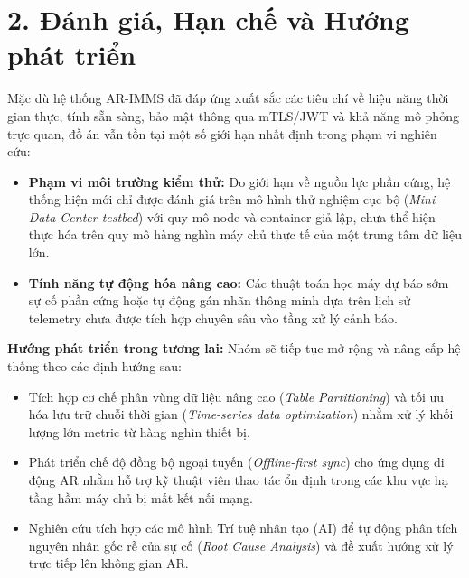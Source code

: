 \section*{2. Đánh giá, Hạn chế và Hướng phát triển}
Mặc dù hệ thống AR-IMMS đã đáp ứng xuất sắc các tiêu chí về hiệu năng thời gian thực, tính sẵn sàng, bảo mật thông qua mTLS/JWT và khả năng mô phỏng trực quan, đồ án vẫn tồn tại một số giới hạn nhất định trong phạm vi nghiên cứu:
\begin{itemize}[leftmargin=2em]
    \item \textbf{Phạm vi môi trường kiểm thử:} Do giới hạn về nguồn lực phần cứng, hệ thống hiện mới chỉ được đánh giá trên mô hình thử nghiệm cục bộ (\textit{Mini Data Center testbed}) với quy mô node và container giả lập, chưa thể hiện thực hóa trên quy mô hàng nghìn máy chủ thực tế của một trung tâm dữ liệu lớn.
    \item \textbf{Tính năng tự động hóa nâng cao:} Các thuật toán học máy dự báo sớm sự cố phần cứng hoặc tự động gán nhãn thông minh dựa trên lịch sử telemetry chưa được tích hợp chuyên sâu vào tầng xử lý cảnh báo.
\end{itemize}

\textbf{Hướng phát triển trong tương lai:} Nhóm sẽ tiếp tục mở rộng và nâng cấp hệ thống theo các định hướng sau:
\begin{itemize}[leftmargin=2em]
    \item Tích hợp cơ chế phân vùng dữ liệu nâng cao (\textit{Table Partitioning}) và tối ưu hóa lưu trữ chuỗi thời gian (\textit{Time-series data optimization}) nhằm xử lý khối lượng lớn metric từ hàng nghìn thiết bị.
    \item Phát triển chế độ đồng bộ ngoại tuyến (\textit{Offline-first sync}) cho ứng dụng di động AR nhằm hỗ trợ kỹ thuật viên thao tác ổn định trong các khu vực hạ tầng hầm máy chủ bị mất kết nối mạng.
    \item Nghiên cứu tích hợp các mô hình Trí tuệ nhân tạo (AI) để tự động phân tích nguyên nhân gốc rễ của sự cố (\textit{Root Cause Analysis}) và đề xuất hướng xử lý trực tiếp lên không gian AR.
\end{itemize}
